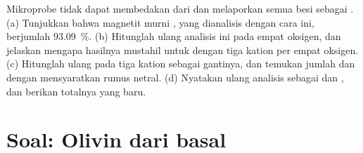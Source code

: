 \begin{exercise}[$\star\star\star$]\label{exo:b1:rock-forming-minerals:12}
Mikroprobe tidak dapat membedakan  dari  dan melaporkan semua besi sebagai . (a) Tunjukkan bahwa magnetit murni , yang dianalisis dengan cara ini, berjumlah \qty{93.09}{\percent}. (b) Hitunglah ulang analisis ini pada empat oksigen, dan jelaskan mengapa hasilnya mustahil untuk  dengan tiga kation per empat oksigen. (c) Hitunglah ulang pada tiga kation sebagai gantinya, dan temukan jumlah  dan  dengan mensyaratkan rumus netral. (d) Nyatakan ulang analisis sebagai  dan , dan berikan totalnya yang baru.
\end{exercise}

\section{Soal: Olivin dari basal}


